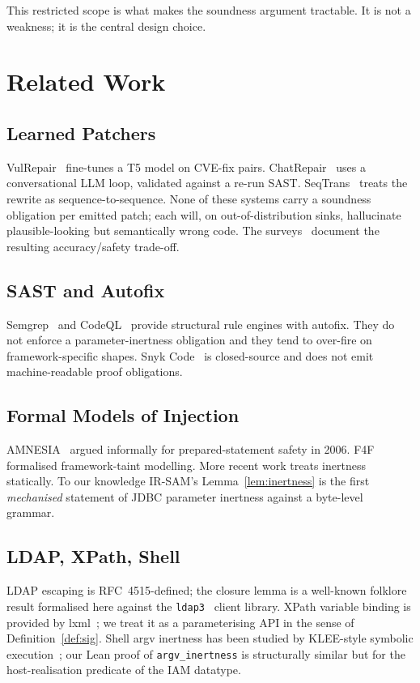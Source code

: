 \documentclass[conference]{IEEEtran}
\newcommand{\IRSAM}{\textsc{IR-SAM}}
\begin{document}
This restricted scope is what makes the soundness argument
tractable. It is not a weakness; it is the central design choice.

\section{Related Work}\label{sec:related}

\subsection{Learned Patchers}
VulRepair~\cite{li_vulrepair_2022} fine-tunes a T5 model on
CVE-fix pairs.  ChatRepair~\cite{xia_chatrepair_2023} uses a
conversational LLM loop, validated against a re-run SAST.
SeqTrans~\cite{chen_seqtrans_2022} treats the rewrite as
sequence-to-sequence.  None of these systems carry a soundness
obligation per emitted patch; each will, on out-of-distribution
sinks, hallucinate plausible-looking but semantically wrong code.
The surveys~\cite{chen_apr_survey_2023, shi_neuralprog_2022}
document the resulting accuracy/safety trade-off.

\subsection{SAST and Autofix}
Semgrep~\cite{semgrep_2024} and CodeQL~\cite{huang_codeql_2017}
provide structural rule engines with autofix.
They do not enforce a parameter-inertness obligation and they tend
to over-fire on framework-specific shapes.  Snyk
Code~\cite{snyk_codereduce_2023} is closed-source and does not
emit machine-readable proof obligations.

\subsection{Formal Models of Injection}
AMNESIA~\cite{mounier_jdbc_2009} argued informally for
prepared-statement safety in 2006.
F4F~\cite{sridharan_javac_2013} formalised framework-taint
modelling.  More recent work
\cite{sas_pi_2023, harvey_ir_lifting_2022} treats inertness
statically.  To our knowledge \IRSAM{}'s
Lemma~\ref{lem:inertness} is the first \emph{mechanised} statement
of JDBC parameter inertness against a byte-level grammar.

\subsection{LDAP, XPath, Shell}
LDAP escaping is RFC~4515-defined; the closure lemma is a
well-known folklore result formalised here against the
\texttt{ldap3}~\cite{ldap3_2024} client library.
XPath variable binding is provided by
lxml~\cite{lxml_2024}; we treat it as a parameterising API in the
sense of Definition~\ref{def:sig}.
Shell argv inertness has been studied by KLEE-style
symbolic execution~\cite{godefroid_klee_2008}; our Lean proof of
\texttt{argv\_inertness} is structurally similar but for the
host-realisation predicate of the IAM datatype.
\end{document}
